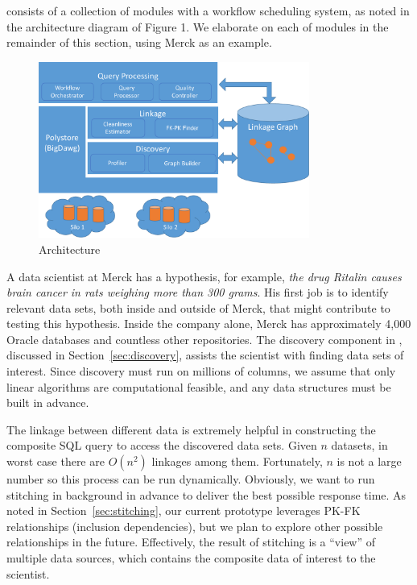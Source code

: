 \dcv consists of a collection of modules with a workflow scheduling system, as noted in the architecture diagram of Figure 1. We elaborate on each of modules in the remainder of this section, using Merck as an example. 



\begin{figure}[!t]
\includegraphics[width=3.5in]{arch3.pdf}
\caption{\dcv Architecture}
\label{fig:arch}
\end{figure}


\stitle{[Discovery]} A data scientist at Merck has a hypothesis, for example, {\it the drug Ritalin causes brain cancer in rats weighing more than 300 grams}.  His first job is to identify relevant data sets, both inside and outside of Merck, that might contribute to testing this hypothesis. Inside the company alone, Merck has approximately 4,000 Oracle databases and countless other repositories. The discovery component in \dcv, discussed in Section~\ref{sec:discovery}, assists the scientist with finding data sets of interest.  Since discovery must run on millions of columns, we assume that only linear algorithms are computational feasible, and any data structures must be built in advance.


\stitle{[Stitching]} The linkage between different data is extremely helpful in constructing the composite \textsf{SQL} query to access the discovered data sets. Given $n$ datasets, in worst case there are $O(n^2)$ linkages among them.  Fortunately, $n$ is not a large number so this process can be run dynamically.  Obviously, we want to run stitching in background in advance to deliver the best possible response time. As noted in Section~\ref{sec:stitching}, our current prototype leverages PK-FK relationships (inclusion dependencies), but we plan to explore other possible relationships in the future.  Effectively, the result of stitching is a ``view'' of multiple data sources, which contains the composite data of interest to the scientist. 


